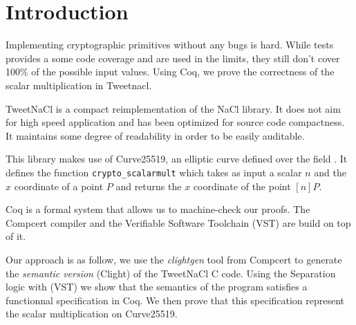 \section{Introduction}

Implementing cryptographic primitives without any bugs is hard.
While tests provides a some code coverage and are used in the limits,
they still don't cover 100\% of the possible input values.
Using Coq, we prove the correctness of the scalar multiplication in Tweetnacl.

TweetNaCl\cite{BGJ+15} is a compact reimplementation of the
NaCl\cite{BLS12} library. It does not aim for high speed
application and has been optimized for source code compactness.
It maintains some degree of readability in order to be
easily auditable.

This library makes use of Curve25519\cite{Ber06}, an elliptic
curve defined over the field \Zfield.
It defines the function \texttt{crypto\_scalarmult} which
takes as input a scalar $n$ and the $x$ coordinate of a
point $P$ and returns the $x$ coordinate of the
point $[n]P$.

Coq is a formal system that allows us to machine-check our proofs. The Compcert\cite{Leroy-backend}
compiler and the Verifiable Software Toolchain (VST)\cite{2012-Appel} are build
on top of it.

Our approach is as follow, we use the \textit{clightgen} tool from Compcert to
generate the \textit{semantic version} (Clight\cite{Blazy-Leroy-Clight-09}) of
the TweetNaCl C code. Using the Separation logic\cite{1969-Hoare,Reynolds02separationlogic}
with (VST) we show that the semantics of the program satisfies a functionnal
specification in Coq. We then prove that this specification represent the scalar
multiplication on Curve25519.
